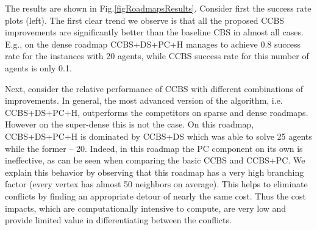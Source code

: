 \documentclass[letterpaper]{article} %
\newcommand\roni[1]{\nb{\textbf{Roni:}}{orange}{#1}}
\newcommand{\cbs}{\ac{CBS}\xspace}
\newcommand{\ccbs}{\ac{CCBS}\xspace}
\newcommand{\pc}{\ac{PC}\xspace}
\newcommand{\ds}{\ac{DS}\xspace}
\begin{document}
The results are shown in Fig.\ref{figRoadmapsResults}. Consider first the success rate plots (left). %
The first clear trend we observe is that all the proposed \ccbs improvements are significantly better than the baseline \cbs in almost all cases. 
E.g., on the dense roadmap \ccbs+\ds+\pc+H manages to achieve 0.8 success rate for the instances with 20 agents, while \ccbs success rate for this number of agents is only 0.1. 


Next, consider the relative performance of \ccbs with different combinations of improvements. In general, the most advanced version of the algorithm, i.e. \ccbs+\ds+\pc+H, outperforms the competitors on sparse and dense roadmaps. 
However on the super-dense this is not the case. On this roadmap, \ccbs+\ds+\pc+H is dominated by \ccbs+\ds which was able to solve 25 agents while the former -- 20. 
Indeed, in this roadmap the \pc component on its own is ineffective, as can be seen when comparing the basic \ccbs and \ccbs+\pc. 
We explain this behavior by observing that this roadmap has a very high branching factor (every vertex has almost 50 neighbors on average). 
This helps to eliminate conflicts by finding an appropriate detour of nearly the same cost. Thus the cost impacts, which are computationally intensive to compute, are very low and provide limited value in differentiating between the conflicts. %



\end{document}
